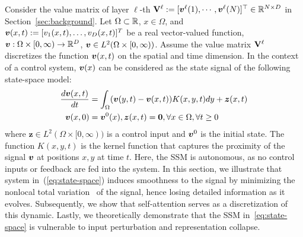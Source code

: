 


Consider the value matrix of layer ${\ell}$-th ${\mathbf V}^{\ell}:=[{\bm v}^{\ell}(1),\cdots,{\bm v}^{\ell}(N)]^\top \in {\mathbb{R}}^{N \times D}$ in Section~\ref{sec:background}. Let $\Omega \subset {\mathbb{R}}$, $x \in \Omega$, and ${\bm v}(x, t):=[v_{1}(x, t), \dots, v_{D}(x, t)]^T$ be a real vector-valued function, ${\bm v}:\Omega \times [0, \infty)\rightarrow {\mathbb{R}}^{D}$, ${\bm v} \in L^{2}(\Omega \times [0, \infty))$. Assume the value matrix ${\mathbf V}^{\ell}$ discretizes the function ${\bm v}(x, t)$ on the spatial and time dimension. In the context of a control system, ${\bm v}(x)$ can be considered as the state signal of the following state-space model:
\begin{align}
\label{eq:state-space}
\frac{d{\bm v}(x, t)}{dt} &=\displaystyle \int_{\Omega}({\bm v}(y, t) - {\bm v}(x, t))K(x, y, t)dy + {\bm z}(x, t) \nonumber \\
    {\bm v}(x, 0) &= {\bm v}^0(x), {\bm z}(x, t) = \bm{0}, \forall x \in \Omega, \forall t \geq 0
\end{align}
where $\bm{z} \in L^{2}(\Omega \times [0, \infty))$ is a control input and ${\bm v}^0$ is the initial state. 
The function $K(x, y, t)$ is the kernel function that captures the proximity of the signal ${\bm v}$ at positions $x, y$ at time $t$.
Here, the SSM is autonomous, as no control inputs or feedback are fed into the system. In this section, we illustrate that system in~(\ref{eq:state-space}) induces smoothness to the signal by minimizing the nonlocal total variation~\cite{Gilboa2008NonlocalOW} of the signal, hence losing detailed information as it evolves. Subsequently, we show that self-attention serves as a discretization of this dynamic. Lastly, we theoretically demonstrate that the SSM in~\ref{eq:state-space} is vulnerable to input perturbation and representation collapse.

